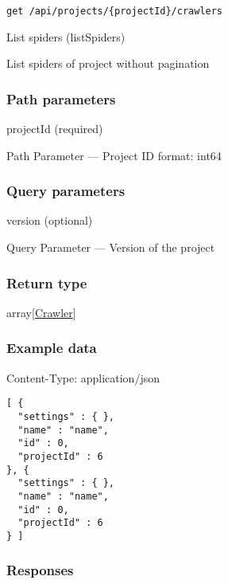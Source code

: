 

\protect\hypertarget{listSpiders}{}{}



\begin{verbatim}
get /api/projects/{projectId}/crawlers
\end{verbatim}

List spiders ({listSpiders})

List spiders of project without pagination

\hypertarget{path-parameters}{%
\subsubsection*{Path parameters}\label{path-parameters}}

projectId (required)

{Path Parameter} --- Project ID format: int64

\hypertarget{query-parameters}{%
\subsubsection*{Query parameters}\label{query-parameters}}

version (optional)

{Query Parameter} --- Version of the project

\hypertarget{return-type}{%
\subsubsection*{Return type}\label{return-type}}

array{[}\protect\hyperlink{Crawler}{Crawler}{]}

\hypertarget{example-data}{%
\subsubsection*{Example data}\label{example-data}}

Content-Type: application/json

\begin{verbatim}
[ {
  "settings" : { },
  "name" : "name",
  "id" : 0,
  "projectId" : 6
}, {
  "settings" : { },
  "name" : "name",
  "id" : 0,
  "projectId" : 6
} ]
\end{verbatim}

\hypertarget{responses}{%
\subsubsection*{Responses}\label{responses}}

